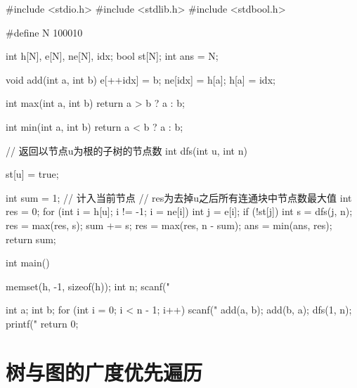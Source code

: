 \begin{mycpptwocol}[树的DFS]
    #include <stdio.h>
    #include <stdlib.h>
    #include <stdbool.h>

    #define N 100010

    int h[N], e[N], ne[N], idx;
    bool st[N];
    int ans = N;

    void add(int a, int b) {
        e[++idx] = b;
        ne[idx] = h[a];
        h[a] = idx;
    }

    int max(int a, int b) {
        return a > b ? a : b;
    }

    int min(int a, int b) {
        return a < b ? a : b;
    }

    // 返回以节点u为根的子树的节点数
    int dfs(int u, int n) {
        st[u] = true;

        int sum = 1; // 计入当前节点
        // res为去掉u之后所有连通块中节点数最大值
        int res = 0;
        for (int i = h[u]; i != -1; i = ne[i]) {
            int j = e[i];
            if (!st[j]) {
                int s = dfs(j, n);
                res = max(res, s);
                sum += s;
            }
        }
        res = max(res, n - sum);
        ans = min(ans, res);
        return sum;
    }

    int main() {
        memset(h, -1, sizeof(h));
        int n;
        scanf("%

        int a;
        int b;
        for (int i = 0; i < n - 1; i++) {
            scanf("%
            add(a, b);
            add(b, a);
        }
        dfs(1, n);
        printf("%
        return 0;
    }
\end{mycpptwocol}


\section{树与图的广度优先遍历}


